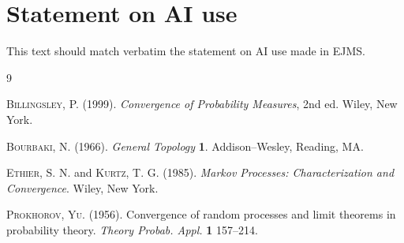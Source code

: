 \documentclass[ejsv2]{imsart}
\theoremstyle{plain}
\theoremstyle{definition}
\theoremstyle{remark}
\begin{document}
\section*{Statement on AI use}
This text should match verbatim the statement on AI use made in EJMS.


\begin{thebibliography}{9}

\textsc{Billingsley, P.} (1999). \textit{Convergence of
Probability Measures}, 2nd ed.
Wiley, New York.

\textsc{Bourbaki, N.}  (1966). \textit{General Topology}  \textbf{1}.
Addison--Wesley, Reading, MA.

\textsc{Ethier, S. N.} and \textsc{Kurtz, T. G.} (1985).
\textit{Markov Processes: Characterization and Convergence}.
Wiley, New York.

\textsc{Prokhorov, Yu.} (1956).
Convergence of random processes and limit theorems in probability
theory. \textit{Theory  Probab.  Appl.}
\textbf{1} 157--214.
\end{thebibliography}
\end{document}
